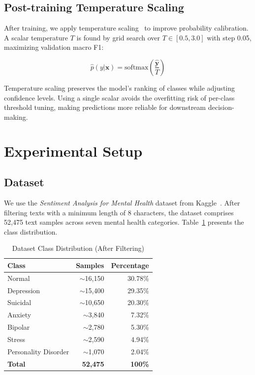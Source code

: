 \documentclass[conference, 10pt]{IEEEtran}
\begin{document}
\subsection{Post-training Temperature Scaling}

After training, we apply temperature scaling~\cite{guo2017calibration} to improve probability calibration. A scalar temperature $T$ is found by grid search over $T \in [0.5, 3.0]$ with step 0.05, maximizing validation macro F1:

\begin{equation}
    \hat{p}(y|\mathbf{x}) = \text{softmax}\left(\frac{\hat{\mathbf{y}}}{T}\right)
    \label{eq:temp}
\end{equation}

Temperature scaling preserves the model's ranking of classes while adjusting confidence levels. Using a single scalar avoids the overfitting risk of per-class threshold tuning, making predictions more reliable for downstream decision-making.


\section{Experimental Setup}

\subsection{Dataset}

We use the \textit{Sentiment Analysis for Mental Health} dataset from Kaggle~\cite{sarkar2023dataset}. After filtering texts with a minimum length of 8 characters, the dataset comprises 52,475 text samples across seven mental health categories. Table~\ref{tab:dataset} presents the class distribution.

\begin{table}[t]
    \centering
    \caption{Dataset Class Distribution (After Filtering)}
    \label{tab:dataset}
    \begin{tabular}{lrr}
        \toprule
        \textbf{Class} & \textbf{Samples} & \textbf{Percentage} \\
        \midrule
        Normal               & $\sim$16,150 & 30.78\% \\
        Depression           & $\sim$15,400 & 29.35\% \\
        Suicidal             & $\sim$10,650 & 20.30\% \\
        Anxiety              &  $\sim$3,840 &  7.32\% \\
        Bipolar              &  $\sim$2,780 &  5.30\% \\
        Stress               &  $\sim$2,590 &  4.94\% \\
        Personality Disorder &  $\sim$1,070 &  2.04\% \\
        \midrule
        \textbf{Total}       & \textbf{52,475} & \textbf{100\%} \\
        \bottomrule
    \end{tabular}
\end{table}
\end{document}
